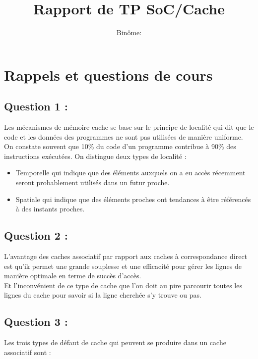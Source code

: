 \documentclass[11pt,a4paper]{article}
\begin{document}
\title{Rapport de TP SoC/Cache}
\author{Binôme:}
\maketitle
\section{Rappels et questions de cours}
    \subsection{Question 1 :}
Les mécanismes de mémoire cache se base sur le principe de localité qui dit que le code et les données des programmes ne sont pas utilisées de manière uniforme. On constate souvent que 10\% du code d'un programme contribue à 90\% des instructions exécutées. On distingue deux types de localité : \\

\begin{itemize}
    \item Temporelle qui indique que des éléments auxquels on a eu accès récemment seront probablement utilisés dans un futur proche.
    \item Spatiale qui indique que des éléments proches ont tendances à être référencés à des instants proches.
\end{itemize}

    \subsection{Question 2 :}
L'avantage des caches associatif par rapport aux caches à correspondance direct est qu'ik permet une grande souplesse et une efficacité pour gérer les lignes de manière optimale en terme de succès d’accès. \\

Et l'inconvénient de ce type de cache que l'on doit au pire parcourir toutes les lignes du cache pour savoir si la
ligne cherchée s’y trouve ou pas.
    
    \subsection{Question 3 :}
Les trois types de défaut de cache qui peuvent se produire dans un cache associatif sont : \\
\end{document}
